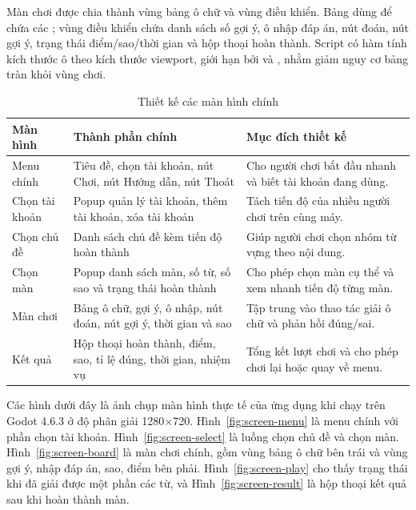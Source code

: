 \documentclass[../DoAn.tex]{subfiles}
\begin{document}
Màn chơi được chia thành vùng bảng ô chữ và vùng điều khiển. Bảng dùng  để chứa các ; vùng điều khiển chứa danh sách số gợi ý, ô nhập đáp án, nút đoán, nút gợi ý, trạng thái điểm/sao/thời gian và hộp thoại hoàn thành. Script  có hàm tính kích thước ô theo kích thước viewport, giới hạn bởi  và , nhằm giảm nguy cơ bảng tràn khỏi vùng chơi.

\begin{table}[H]
\centering
\small
\begin{tabularx}{\textwidth}{|>{\RaggedRight\arraybackslash}p{3.2cm}|>{\RaggedRight\arraybackslash}p{4.4cm}|>{\RaggedRight\arraybackslash}X|}
\hline
\textbf{Màn hình} & \textbf{Thành phần chính} & \textbf{Mục đích thiết kế} \\ \hline
Menu chính & Tiêu đề, chọn tài khoản, nút Chơi, nút Hướng dẫn, nút Thoát & Cho người chơi bắt đầu nhanh và biết tài khoản đang dùng. \\ \hline
Chọn tài khoản & Popup quản lý tài khoản, thêm tài khoản, xóa tài khoản & Tách tiến độ của nhiều người chơi trên cùng máy. \\ \hline
Chọn chủ đề & Danh sách chủ đề kèm tiến độ hoàn thành & Giúp người chơi chọn nhóm từ vựng theo nội dung. \\ \hline
Chọn màn & Popup danh sách màn, số từ, số sao và trạng thái hoàn thành & Cho phép chọn màn cụ thể và xem nhanh tiến độ từng màn. \\ \hline
Màn chơi & Bảng ô chữ, gợi ý, ô nhập, nút đoán, nút gợi ý, thời gian và sao & Tập trung vào thao tác giải ô chữ và phản hồi đúng/sai. \\ \hline
Kết quả & Hộp thoại hoàn thành, điểm, sao, tỉ lệ đúng, thời gian, nhiệm vụ & Tổng kết lượt chơi và cho phép chơi lại hoặc quay về menu. \\ \hline
\end{tabularx}
\caption{Thiết kế các màn hình chính}
\label{table:ui_screens}
\end{table}

Các hình dưới đây là ảnh chụp màn hình thực tế của ứng dụng khi chạy trên Godot 4.6.3 ở độ phân giải 1280$\times$720. Hình~\ref{fig:screen-menu} là menu chính với phần chọn tài khoản. Hình~\ref{fig:screen-select} là luồng chọn chủ đề và chọn màn. Hình~\ref{fig:screen-board} là màn chơi chính, gồm vùng bảng ô chữ bên trái và vùng gợi ý, nhập đáp án, sao, điểm bên phải. Hình~\ref{fig:screen-play} cho thấy trạng thái khi đã giải được một phần các từ, và Hình~\ref{fig:screen-result} là hộp thoại kết quả sau khi hoàn thành màn.
\end{document}
